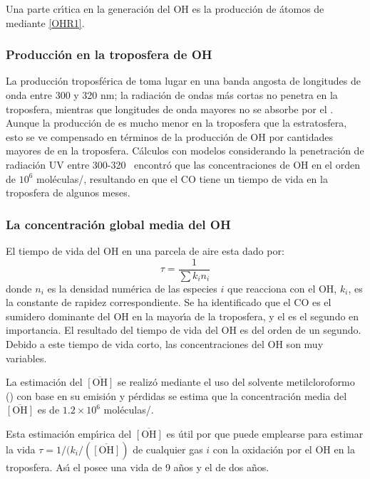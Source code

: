 Una parte cr\'{\i}tica en la generaci\'on del OH es la producci\'on de \'atomos de    mediante \ref{OHR1}. 

\subsubsection{Producci\'on en la troposfera de OH}
La producci\'on troposf\'erica de  toma lugar en una  banda angosta de longitudes de onda entre 300 y 320 nm; la radiaci\'on de ondas m\'as cortas no penetra en la troposfera, mientras que longitudes de onda mayores no se absorbe por el . Aunque la producci\'on de  es mucho menor en la troposfera que la estratosfera, esto se ve compensado en t\'erminos de la producci\'on de OH por cantidades mayores de  en la troposfera. C\'alculos con modelos considerando la penetraci\'on de radiaci\'on UV entre 300-320 \nano\metre\,  encontr\'o que las concentraciones de OH en el orden de $10^6$ mol\'eculas/\cubic\metre, resultando en que el CO tiene un tiempo de vida en la troposfera de algunos meses.
\subsubsection{La concentraci\'on global media del OH}
El tiempo de vida del OH en una parcela de aire esta dado por:
\begin{equation*}
\tau=\frac{1}{\sum k_in_i}
\end{equation*}
donde $n_i$ es la densidad num\'erica de las especies $i$ que reacciona con el OH, $k_i$, es la constante de rapidez  correspondiente. Se ha identificado que el CO es el sumidero dominante del OH en la mayor\'{\i}a de la troposfera, y el  es el segundo en importancia. El resultado del tiempo de vida del OH es del orden de un segundo. Debido a este tiempo de vida corto, las concentraciones del OH son muy variables.

La estimaci\'on del  $\overline{[\mathrm{OH}]}$ se realiz\'o mediante el uso del solvente metilcloroformo () con base en su emisi\'on y p\'erdidas se estima que la concentraci\'on media del  $\overline{[\mathrm{OH}]}$ es de $1.2\times10^6$ mol\'eculas/\centi\cubic\metre.

Esta estimaci\'on emp\'{\i}rica del   $\overline{[\mathrm{OH}]}$ es \'util por que puede emplearse para estimar la vida  $\tau=1/(k_i/(\overline{[\mathrm{OH}]})$ de cualquier gas $i$ con la oxidaci\'on por el OH en la troposfera. As\'{\i} el  posee una vida de 9 a\~nos y el  de dos a\~nos.

